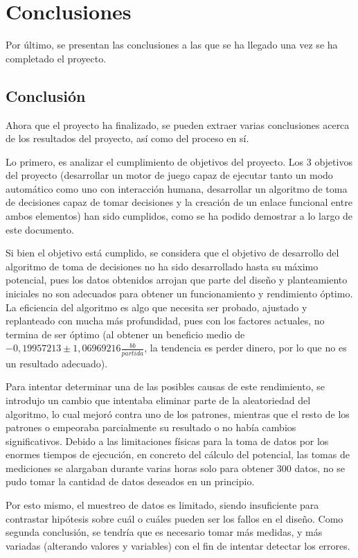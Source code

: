 \chapter{Conclusiones}

Por último, se presentan las conclusiones a las que se ha llegado una vez se ha completado el proyecto.

\section{Conclusión}

Ahora que el proyecto ha finalizado, se pueden extraer varias conclusiones acerca de los resultados del proyecto, así como del proceso en sí. 

Lo primero, es analizar el cumplimiento de objetivos del proyecto.
Los 3 objetivos del proyecto (desarrollar un motor de juego capaz de ejecutar tanto un modo automático como uno con interacción humana, desarrollar un algoritmo de toma de decisiones capaz de tomar decisiones y la creación de un enlace funcional entre ambos elementos) han sido cumplidos, como se ha podido demostrar a lo largo de este documento.

Si bien el objetivo está cumplido, se considera que el objetivo de desarrollo del algoritmo de toma de decisiones no ha sido desarrollado hasta su máximo potencial, pues los datos obtenidos arrojan que parte del diseño y planteamiento iniciales no son adecuados para obtener un funcionamiento y rendimiento óptimo. 
La eficiencia del algoritmo es algo que necesita ser probado, ajustado y replanteado con mucha más profundidad, pues con los factores actuales, no termina de ser óptimo (al obtener un beneficio medio de  $-0,19957213\pm1,06969216$$\frac{bb}{partida}$, la tendencia es perder dinero, por lo que no es un resultado adecuado).

Para intentar determinar una de las posibles causas de este rendimiento, se introdujo un cambio que intentaba eliminar parte de la aleatoriedad del algoritmo, lo cual mejoró contra uno de los patrones, mientras que el resto de los patrones o empeoraba parcialmente su resultado o no había cambios significativos.
Debido a las limitaciones físicas para la toma de datos por los enormes tiempos de ejecución, en concreto del cálculo del potencial, las tomas de mediciones se alargaban durante varias horas solo para obtener 300 datos, no se pudo tomar la cantidad de datos deseados en un principio.

Por esto mismo, el muestreo de datos es limitado, siendo insuficiente para contrastar hipótesis sobre cuál o cuáles pueden ser los fallos en el diseño. Como segunda conclusión, se tendría que es necesario tomar más medidas, y más variadas (alterando valores y variables) con el fin de intentar detectar los errores.

